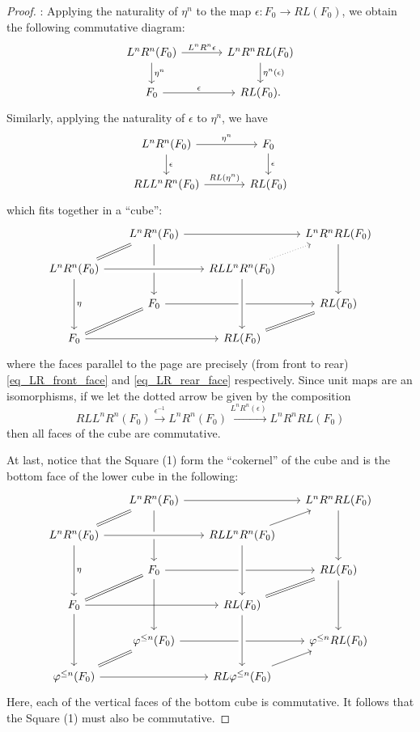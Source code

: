 \begin{proof}
 : Applying the naturality of
$\eta^n$ to the map $\epsilon: F_0 \to RL(F_0)$, we obtain the 
following commutative diagram:
\begin{equation}\label{eq_LR_rear_face}
\begin{tikzcd}[column sep=large]
L^nR^n(F_0) \arrow{r}{L^nR^n\epsilon} \arrow{d}{\eta^n} &
L^nR^nRL(F_0) \arrow{d}{\eta^n(\epsilon)} \\
F_0 \arrow{r}{\epsilon} &
RL(F_0).
\end{tikzcd}
\end{equation}
Similarly, applying the naturality of $\epsilon$ to $\eta^n$, we
have
\begin{equation}\label{eq_LR_front_face}
\begin{tikzcd}[column sep=large]
L^nR^n(F_0) \arrow{d}{\epsilon} \arrow{r}{\eta^n} &
F_0 \arrow{d}{\epsilon} \\
RLL^nR^n(F_0) \arrow{r}{RL(\eta^n)} &
RL(F_0)
\end{tikzcd}
\end{equation}
which fits together in a ``cube'':
\[
\begin{tikzcd}[row sep=scriptsize, column sep=scriptsize]
& L^nR^n(F_0) \arrow[equals]{dl}\arrow{rr}\arrow{dd}{\eta} & & 
   L^nR^nRL(F_0) \arrow{dd} \\
L^nR^n(F_0) \arrow[crossing over]{rr}\arrow{dd}{\eta} & & RLL^nR^n(F_0) 
   \arrow[dotted]{ur} \\
& F_0 \arrow[equals]{dl}\arrow{rr} & & RL(F_0) 
   \arrow[equals]{dl} \\
F_0 \arrow{rr} & & RL(F_0) \arrow[crossing over, leftarrow]{uu}
\end{tikzcd}
\]
where the faces parallel to the page are precisely (from front to
rear) \eqref{eq_LR_front_face} and \ref{eq_LR_rear_face}
respectively. Since unit maps are an isomorphisms, if we let the 
dotted arrow be given by the composition
\[
RLL^nR^n(F_0) \stackrel{\epsilon^{-1}}{\to} L^nR^n(F_0) 
\xrightarrow{L^nR^n(\epsilon)} L^nR^nRL(F_0)
\]
then all faces of the cube are commutative.

At last, notice that the Square (1) form the ``cokernel'' of the
cube and is the bottom face of the lower cube in the following:
\[
\begin{tikzcd}[row sep=scriptsize, column sep=scriptsize]
& L^nR^n(F_0) \arrow[equals]{dl}\arrow{rr}\arrow{dd}{\eta} & & 
   L^nR^nRL(F_0) \arrow{dd} \\
L^nR^n(F_0) \arrow[crossing over]{rr}\arrow{dd}{\eta} & & 
   RLL^nR^n(F_0) \arrow{ur} \\
& F_0 \arrow[equals]{dl}\arrow{rr} \arrow{dd} & & RL(F_0) \arrow{dd}
   \arrow[equals]{dl} \\
F_0 \arrow{rr} \arrow{dd} & & 
   RL(F_0) \arrow[crossing over, leftarrow]{uu} \\
& \tlHI{n}(F_0) \arrow[equals]{dl}\arrow{rr} & & 
   \tlHI{n} RL(F_0) \arrow[leftarrow]{dl}\\
\tlHI{n}(F_0) \arrow{rr} & & 
   RL\tlHI{n}(F_0) \arrow[crossing over, leftarrow]{uu} 
\end{tikzcd}
\]
Here, each of the vertical faces of the bottom cube is commutative.
It follows that the Square (1) must also be commutative.


\end{proof}
